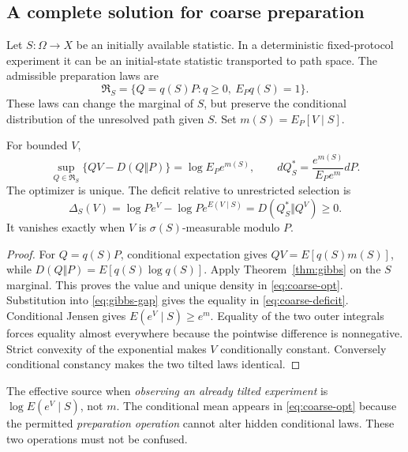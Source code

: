 \subsection{A complete solution for coarse preparation}
Let $S:\Omega\to X$ be an initially available statistic. In a deterministic fixed-protocol experiment it can be an initial-state statistic transported to path space. The admissible preparation laws are
\[
 \mathfrak R_S=\{Q=q(S)P:q\ge0,\ E_Pq(S)=1\}.
\]
These laws can change the marginal of $S$, but preserve the conditional distribution of the unresolved path given $S$. Set $m(S)=E_P[V\mid S]$.

\begin{theorem}\label{thm:coarse-prep}
For bounded $V$,
\begin{equation}
 \sup_{Q\in\mathfrak R_S}\{QV-D(Q\Vert P)\}
 =\log E_Pe^{m(S)},
 \qquad
 dQ_S^*=\frac{e^{m(S)}}{E_Pe^m}dP.
 \label{eq:coarse-opt}
\end{equation}
The optimizer is unique. The deficit relative to unrestricted selection is
\begin{equation}
 \Delta_S(V)=\log Pe^V-\log Pe^{E(V\mid S)}
 =D(Q_S^*\Vert Q^V)\ge0.
 \label{eq:coarse-deficit}
\end{equation}
It vanishes exactly when $V$ is $\sigma(S)$-measurable modulo $P$.
\end{theorem}
\begin{proof}
For $Q=q(S)P$, conditional expectation gives $QV=E[q(S)m(S)]$, while $D(Q\Vert P)=E[q(S)\log q(S)]$. Apply Theorem~\ref{thm:gibbs} on the $S$ marginal. This proves the value and unique density in \eqref{eq:coarse-opt}. Substitution into \eqref{eq:gibbs-gap} gives the equality in \eqref{eq:coarse-deficit}. Conditional Jensen gives $E(e^V\mid S)\ge e^m$. Equality of the two outer integrals forces equality almost everywhere because the pointwise difference is nonnegative. Strict convexity of the exponential makes $V$ conditionally constant. Conversely conditional constancy makes the two tilted laws identical.
\end{proof}

The effective source when \emph{observing an already tilted experiment} is $\log E(e^V\mid S)$, not $m$. The conditional mean appears in \eqref{eq:coarse-opt} because the permitted \emph{preparation operation} cannot alter hidden conditional laws. These two operations must not be confused.

